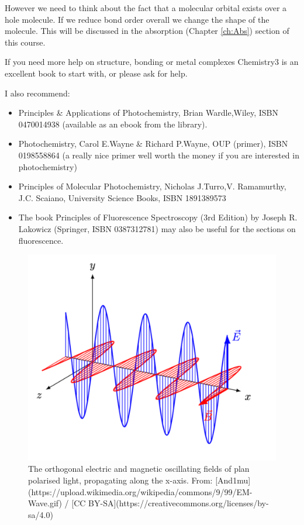 \documentclass[
]{book}
\providecommand{\tightlist}{%
  \setlength{\itemsep}{0pt}\setlength{\parskip}{0pt}}
\begin{document}
However we need to think about the fact that a molecular orbital exists over a hole molecule. If we reduce bond order overall we change the shape of the molecule. This will be discussed in the absorption (Chapter \ref{ch:Abs}) section of this course.

If you need more help on structure, bonding or metal complexes Chemistry3 is an excellent book to start with, or please ask for help.

I also recommend:

\begin{itemize}
\tightlist
\item
  Principles \& Applications of Photochemistry, Brian Wardle,Wiley, ISBN 0470014938 (available as an ebook from the library).
\item
  Photochemistry, Carol E.Wayne \& Richard P.Wayne, OUP (primer), ISBN 0198558864 (a really nice primer well worth the money if you are interested in photochemistry)
\item
  Principles of Molecular Photochemistry, Nicholas J.Turro,V. Ramamurthy, J.C. Scaiano, University Science Books, ISBN 1891389573
\item
  The book Principles of Fluorescence Spectroscopy (3rd Edition) by Joseph R. Lakowicz (Springer, ISBN 0387312781) may also be useful for the sections on fluorescence.
\end{itemize}

\begin{figure}

{\centering \includegraphics[width=0.6\linewidth]{images/EM-Wave} 

}

\caption{The orthogonal electric and magnetic oscillating fields of plan polarised light, propagating along the x-axis. From: [And1mu](https://upload.wikimedia.org/wikipedia/commons/9/99/EM-Wave.gif) / [CC BY-SA](https://creativecommons.org/licenses/by-sa/4.0)}\label{fig:EMWave}
\end{figure}
\end{document}
